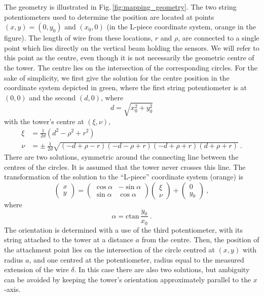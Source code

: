 The geometry is illustrated in Fig.\,\ref{fig:mapping_geometry}.
The two string potentiometers used to determine the position are located at points $(x, y) = (0, y_0)$ and $(x_0, 0)$ (in the L-piece coordinate system, orange in the figure).
The length of wire from these locations, $r$ and $\rho$, are connected to a single point which lies directly on the vertical beam holding the sensors.
We will refer to this point as the centre, even though it is not necessarily the geometric centre of the tower.
The centre lies on the intersection of the corresponding circles.
For the sake of simplicity, we first give the solution for the centre position in the coordinate system depicted in green,
where the first string potentiometer is at $(0,0)$ and the second $(d, 0)$, where
\begin{equation}
  d = \sqrt{x_0^2 + y_0^2}
\end{equation}
with the tower's centre at $(\xi, \nu)$,
\begin{align}
  \xi & = \frac{1}{2d} \left( d^2 - \rho^2 + r^2 \right) \\
  \nu & = \pm\ \frac{1}{2d} \sqrt{ (-d + \rho - r) (-d - \rho + r) (-d + \rho + r) (d + \rho + r) } \ .
\end{align}
There are two solutions, symmetric around the connecting line between the centres of the circles.
It is assumed that the tower never crosses this line.
The transformation of the solution to the ``L-piece'' coordinate system (orange) is
\begin{equation}
  \begin{pmatrix}
    x \\
    y
  \end{pmatrix}
  =
  \begin{pmatrix}
    \cos \alpha & -\sin \alpha \\
    \sin \alpha & \cos \alpha
  \end{pmatrix}
  \begin{pmatrix}
    \xi \\
    \nu
  \end{pmatrix}
  +
  \begin{pmatrix}
    0 \\
    y_0
  \end{pmatrix} \ ,
\end{equation}
where
\begin{equation}
  \alpha = \mathrm{ctan}\, \frac{y_0}{x_0} \ .
\end{equation}
The orientation is determined with a use of the third potentiometer, with its string attached to the tower at a distance $a$ from the centre.
Then, the position of the attachment point lies on the intersection of the circle centred at $(x,y)$ with radius $a$, and one centred at the potentiometer, radius equal to the measured extension of the wire $\delta$.
In this case there are also two solutions, but ambiguity can be avoided by keeping the tower's orientation approximately parallel to the $x$-axis.

